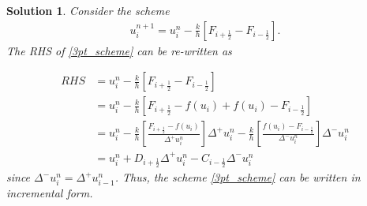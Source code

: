 \documentclass[10pt,letterpaper]{article}
\newcommand{\iph}{{i + \frac{1}{2}}}
\newcommand{\imh}{{i - \frac{1}{2}}}
\theoremstyle{break}
\newtheorem{mysolution}{Solution}
\newenvironment{solution}{\begin{mysolution}}{\end{mysolution}}
\begin{document}
\begin{solution}
        Consider the scheme
        \begin{gather} \label{3pt_scheme}
        u_i^{n+1} = u^n_i - \frac{k}{h} \left[ F_\iph - F_\imh\right].
        \end{gather}
        The RHS of \eqref{3pt_scheme} can be re-written as

        \begin{align*}
        RHS &= u^n_i - \frac{k}{h} \left[ F_\iph - F_\imh\right]\\
                &= u^n_i - \frac{k}{h} \left[ F_\iph  - f(u_i) + f(u_i) - F_\imh\right]\\
                &= u^n_i - \frac{k}{h} \left[ \frac{F_\iph  - f(u_i)}{\Delta ^+u_i^n} \right] \Delta ^+u_i^n - \frac{k}{h}\left[\frac{f(u_i) - F_\imh}{\Delta ^-u_i^n}\right]\Delta ^-u_i^n\\
                &= u^n_i +  D_\iph \Delta ^+u_i^n - C_\imh \Delta ^-u_i^n
        \end{align*}
        since $\Delta ^-u_i^n = \Delta ^+u_{i-1}^n$. Thus, the scheme \eqref{3pt_scheme} can be written in incremental form.
\end{solution}
\end{document}
